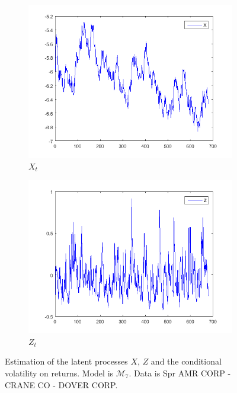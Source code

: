 \documentclass[11pt,a4,twosided,singlespacing,titlepagenumber=on]{scrreprt}
\numberwithin{equation}{chapter} %
\theoremstyle{remark}
\begin{document}
\begin{figure}[H]
    \centering
    \begin{subfigure}[t]{0.42\textwidth}
        \centering
        \includegraphics[width=1\textwidth]{est/1}
        \caption{$X_t$}
        \label{est_1}
    \end{subfigure}
    \begin{subfigure}[t]{0.42\textwidth}
        \centering
        \includegraphics[width=1\textwidth]{est/2}
        \caption{$Z_t$}
        \label{est_2}
    \end{subfigure}
    \caption{Estimation of the latent processes $X$, $Z$ and the conditional volatility on returns. Model is $\mathcal{M}_7$. Data is Spr AMR CORP - CRANE CO - DOVER CORP.}
    \label{estimation_of_latent_processes}
\end{figure}
\end{document}
